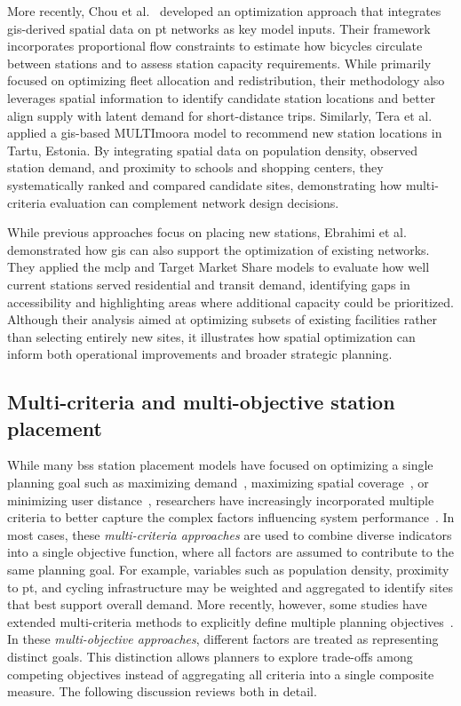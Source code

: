 More recently, Chou et al.~\cite{Chou2019} developed an optimization approach that integrates \ac{gis}-derived spatial data on \ac{pt} networks as key model inputs. Their framework incorporates proportional flow constraints to estimate how bicycles circulate between stations and to assess station capacity requirements. While primarily focused on optimizing fleet allocation and redistribution, their methodology also leverages spatial information to identify candidate station locations and better align supply with latent demand for short-distance trips. Similarly, Tera et al.~\cite{Tera2023} applied a \ac{gis}-based MULTI\ac{moora} model to recommend new station locations in Tartu, Estonia. By integrating spatial data on population density, observed station demand, and proximity to schools and shopping centers, they systematically ranked and compared candidate sites, demonstrating how multi-criteria evaluation can complement network design decisions.

While previous approaches focus on placing new stations, Ebrahimi et al.~\cite{Ebrahimi2022} demonstrated how \ac{gis} can also support the optimization of existing networks. They applied the \ac{mclp} and Target Market Share models to evaluate how well current stations served residential and transit demand, identifying gaps in accessibility and highlighting areas where additional capacity could be prioritized. Although their analysis aimed at optimizing subsets of existing facilities rather than selecting entirely new sites, it illustrates how spatial optimization can inform both operational improvements and broader strategic planning.


\subsection{Multi-criteria and multi-objective station placement}

While many \ac{bss} station placement models have focused on optimizing a single planning goal such as maximizing demand~\cite{GarciaPalomares2012}, maximizing spatial coverage~\cite{Frade2015}, or minimizing user distance~\cite{Cintrano2018}, researchers have increasingly incorporated multiple criteria to better capture the complex factors influencing system performance~\cite{Kabak2018, Guler2021a, Guler2021b, Bahadori2022, Wang2021_modeling, Veillette2018, Fazio2021, Tera2023, Hafezalkotob2019}. In most cases, these \textit{multi-criteria approaches} are used to combine diverse indicators into a single objective function, where all factors are assumed to contribute to the same planning goal. For example, variables such as population density, proximity to \ac{pt}, and cycling infrastructure may be weighted and aggregated to identify sites that best support overall demand. More recently, however, some studies have extended multi-criteria methods to explicitly define multiple planning objectives~\cite{Duran-Rodas2021, Caggiani2020, Fan2024, Qian2022, Nikiforiadis2021}. In these \textit{multi-objective approaches}, different factors are treated as representing distinct goals. This distinction allows planners to explore trade-offs among competing objectives instead of aggregating all criteria into a single composite measure. The following discussion reviews both in detail.

